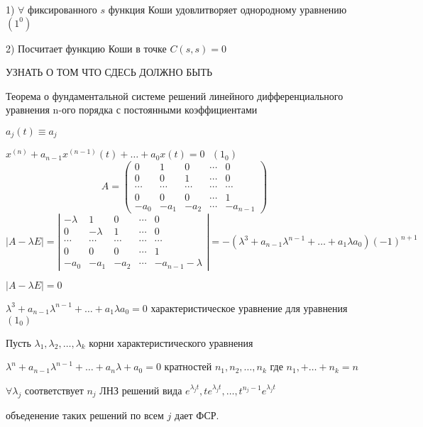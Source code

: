 \begin{block}
  1) $\forall$ фиксированного $s$ функция Коши удовлитворяет однородному
  уравнению $(1^0)$

  2) Посчитает функцию Коши в точке $C(s,s) = 0$

  УЗНАТЬ О ТОМ ЧТО СДЕСЬ ДОЛЖНО БЫТЬ
\end{block}

\begin{title}[\Large]
  Теорема о фундаментальной системе решений линейного дифференциального
  уравнения n-ого порядка с постоянными коэффициентами
\end{title}

\begin{define}
  $a_j(t) \equiv a_j$

  $x^{(n)} + a_{n-1} x^{(n-1)}(t) + \ldots + a_0x(t) = 0 ~~~ (1_0)$
  $$
  A =
  \left(
  \begin{array}{ccccc}
    0 & 1 & 0 & \cdots & 0 \\
    0 & 0 & 1 & \cdots & 0 \\
    \cdots & \cdots & \cdots & \cdots & \cdots \\
    0 & 0 & 0 & \cdots & 1 \\
    -a_0 & -a_1 & -a_2 & \cdots & -a_{n-1}
  \end{array}
  \right)
  $$
  $$
  |A - \lambda E| =
  \left|
  \begin{array}{ccccc}
    -\lambda & 1 & 0 & \cdots & 0 \\
    0 & -\lambda & 1 & \cdots & 0 \\
    \cdots & \cdots & \cdots & \cdots & \cdots \\
    0 & 0 & 0 & \cdots  &  1\\
    -a_0 & -a_1 & -a_2 & \cdots & -a_{n-1} - \lambda
  \end{array}
  \right|
  = -(\lambda^3 + a_{n-1}\lambda^{n-1} + \ldots + a_1\lambda a_0)(-1)^{n+1}
  $$

  $|A - \lambda E| = 0$

  $\lambda^3 + a_{n-1}\lambda^{n-1} + \ldots + a_1\lambda a_0 = 0$
  характеристическое уравнение для уравнения $(1_0)$
\end{define}

\begin{theorem}
  Пусть $\lambda_1, \lambda_2, \ldots, \lambda_k$ корни характеристического
  уравнения

  $\lambda^n + a_{n-1} \lambda^{n-1} + \ldots + a_n\lambda + a_0 = 0$ кратностей
  $n_1, n_2, \ldots, n_k$ где $n_1, + \ldots + n_k = n$

  $\forall \lambda_j$ соответствует $n_j$ ЛНЗ решений вида $e^{\lambda_j t},
  te^{\lambda_j t}, \ldots, t^{n_j - 1} e^{\lambda_j t}$

  объеденение таких решений по всем $j$ дает ФСР.
\end{theorem}

